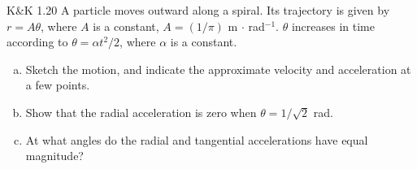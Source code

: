 \documentclass{esg8012pset}
\begin{document}
\begin{problem}{K\&K 1.20}
  A particle moves outward along a spiral. Its trajectory is given by
  $r = A\theta$, where $A$ is a constant, $A = (1/\pi )$ m $\cdot$ rad$^{-1}$.  $\theta$ increases in time according to $\theta =\alpha t^2 / 2$, where $\alpha$ is a constant.
  \begin{enumerate}[a.]
    \item Sketch the motion, and indicate the approximate velocity and acceleration at a few
  points.
    \item Show that the radial acceleration is zero when $\theta =1/\sqrt{2}$ rad.
    \item At what angles do the radial and tangential accelerations have equal magnitude?
  \end{enumerate}
\end{problem}
\end{document}
